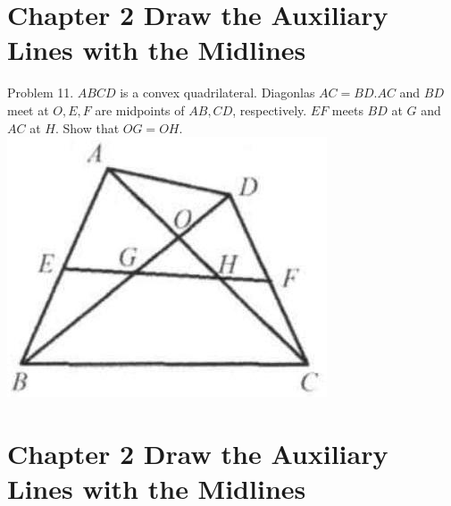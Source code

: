 \documentclass[10pt]{article}
\begin{document}
\section*{Chapter 2 Draw the Auxiliary Lines with the Midlines}
Problem 11. \(A B C D\) is a convex quadrilateral. Diagonlas \(A C=B D . A C\) and \(B D\) meet at \(O, E, F\) are midpoints of \(A B, C D\), respectively. \(E F\) meets \(B D\) at \(G\) and \(A C\) at \(H\). Show that \(O G=O H\).\\
\includegraphics[max width=\textwidth, center]{2025_04_17_97bc1f7e44d93c271a88g-046}

\section*{Chapter 2 Draw the Auxiliary Lines with the Midlines}
\end{document}
